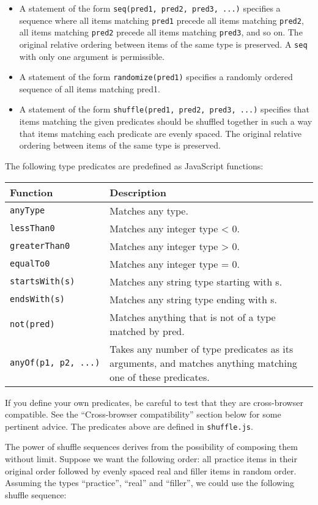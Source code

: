 \documentclass[]{article}
\begin{document}
\begin{itemize}
\item
  A statement of the form \texttt{seq(pred1,\ pred2,\ pred3,\ ...)}
  specifies a sequence where all items matching \texttt{pred1} precede
  all items matching \texttt{pred2}, all items matching \texttt{pred2}
  precede all items matching \texttt{pred3}, and so on. The original
  relative ordering between items of the same type is preserved. A
  \texttt{seq} with only one argument is permissible.
\item
  A statement of the form \texttt{randomize(pred1)} specifies a randomly
  ordered sequence of all items matching pred1.
\item
  A statement of the form \texttt{shuffle(pred1,\ pred2,\ pred3,\ ...)}
  specifies that items matching the given predicates should be shuffled
  together in such a way that items matching each predicate are evenly
  spaced. The original relative ordering between items of the same type
  is preserved.
\end{itemize}

The following type predicates are predefined as JavaScript functions:

\begin{longtable}[c]{p{1in}p{5in}}
\toprule
\textbf{Function} & \textbf{Description}\tabularnewline
\midrule
\endhead
\texttt{anyType} & Matches any type.\tabularnewline
\texttt{lessThan0} & Matches any integer type \textless{}
0.\tabularnewline
\texttt{greaterThan0} & Matches any integer type \textgreater{}
0.\tabularnewline
\texttt{equalTo0} & Matches any integer type = 0.\tabularnewline
\texttt{startsWith(s)} & Matches any string type starting with
s.\tabularnewline
\texttt{endsWith(s)} & Matches any string type ending with
s.\tabularnewline
\texttt{not(pred)} & Matches anything that is not of a type matched by
pred.\tabularnewline
\texttt{anyOf(p1,\ p2,\ ...)} & Takes any number of type predicates as
its arguments, and matches anything matching one of these
predicates.\tabularnewline
\bottomrule
\end{longtable}

If you define your own predicates, be careful to test that they are
cross-browser compatible. See the ``Cross-browser compatibility''
section below for some pertinent advice. The predicates above are
defined in \texttt{shuffle.js}.

The power of shuffle sequences derives from the possibility of composing
them without limit. Suppose we want the following order: all practice
items in their original order followed by evenly spaced real and filler
items in random order. Assuming the types ``practice'', ``real'' and
``filler'', we could use the following shuffle sequence:
\end{document}
